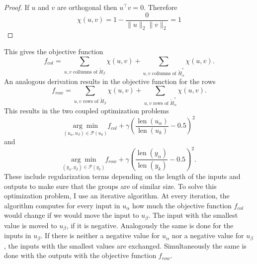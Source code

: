 \documentclass[numbers=noenddot,doctype=mastersthesis,BCOR=15mm,biblatex]{ldvbook}%
\DeclareMathOperator{\length}{len}
\newcommand{\partition}{\mathcal{P}}
\begin{document}
\begin{proof}
	If $u$ and $v$ are orthogonal then $u^\top v =0$. Therefore
	\begin{equation}
	\chi(u,v) = 1-\frac{0}{\|u\|_2\|v\|_2}= 1
	\end{equation}
\end{proof}
This gives the objective function
\begin{equation}
f_{col} = \sum_{u,v \text{ collumns of }  \tilde{H}_\beta}\!\!\!\!\!\!\chi(u,v)
+\sum_{u,v \text{ collumns of } \tilde{H}_\alpha^*}\!\!\!\!\!\!\chi(u,v)
.
\end{equation}
An analogous derivation results in the objective function for the rows
\begin{equation}
f_{row} = \sum_{u,v \text{ rows of }  \tilde{H}_\beta}\!\!\!\chi(u,v)
+\sum_{u,v \text{ rows of }  \tilde{H}_\alpha^*}\!\!\!\chi(u,v)
.
\end{equation}
This results in the two coupled optimization problems
\begin{equation}
\underset{(u_\alpha, u_\beta) \in \partition(u_k)}{\arg\min} f_{col} + \gamma
\left(\frac{\length(u_\alpha)}{\length(u_k)}-0.5\right)^2
\end{equation}
and 
\begin{equation}
\underset{(y_\alpha, y_\beta) \in \partition(y_k)}{\arg\min} f_{row} + \gamma 
\left(\frac{\length(y_\alpha)}{\length(y_k)}-0.5\right)^2
.
\end{equation}
These include regularization terms depending on the length of the inputs and outputs to make sure that the groups are of similar size.
To solve this optimization problem, I use an iterative algorithm.
At every iteration, the algorithm computes for every input in $u_\alpha$ how much the objective function $f_{col}$ would change if we would move the input to $u_\beta$.
The input with the smallest value is moved to $u_\beta$, if it is negative.
Analogously the same is done for the inputs in $u_\beta$.
If there is neither a negative value for  $u_\alpha$ nor a negative value for $u_\beta$, the inputs with the smallest values are exchanged.
Simultaneously the same is done with the outputs with the objective function $f_{row}$.
\end{document}
